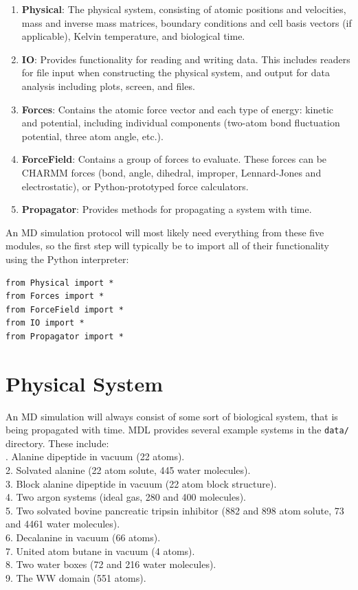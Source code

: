 \documentclass[11pt]{report}
\begin{document}
\begin{enumerate}
\item {\bf Physical}: The physical system, consisting of atomic positions
and velocities, mass and inverse mass matrices, boundary conditions
and cell basis vectors (if applicable), Kelvin temperature, and
biological time.
\item {\bf IO}: Provides functionality for reading and writing data.
This includes readers for file input when constructing the physical
system, and output for data analysis including plots, screen, and 
files.
\item {\bf Forces}: Contains the atomic force vector and each type
of energy: kinetic and potential, including individual components 
(two-atom bond fluctuation potential, three atom angle, etc.).
\item {\bf ForceField}: Contains a group of forces to evaluate.  These forces
can be CHARMM forces (bond, angle, dihedral, improper, Lennard-Jones
and electrostatic), or Python-prototyped force calculators.
\item {\bf Propagator}: Provides methods for propagating a system with time.
\end{enumerate}

An MD simulation protocol will most likely need everything
from these five modules, so the first step will typically be to
import all of their functionality using the Python interpreter:

\begin{verbatim}
from Physical import *
from Forces import *
from ForceField import *
from IO import *
from Propagator import *
\end{verbatim}

\section{Physical System}

An MD simulation will always consist of some sort of biological
system, that is being propagated with time.  MDL provides several
example systems in the \texttt{data/} directory.  These include: \\

. Alanine dipeptide in vacuum (22 atoms).\\
2. Solvated alanine (22 atom solute, 445 water molecules).\\
3. Block alanine dipeptide in vacuum (22 atom block structure).\\
4. Two argon systems (ideal gas, 280 and 400 molecules).\\
5. Two solvated bovine pancreatic tripsin inhibitor (882 and 898 atom solute, 73 and 4461 water molecules).\\
6. Decalanine in vacuum (66 atoms).\\
7. United atom butane in vacuum (4 atoms).\\
8. Two water boxes (72 and 216 water molecules).\\
9. The WW domain (551 atoms).\\
\end{document}
